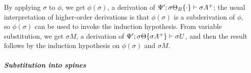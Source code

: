 \begin{itemize}
  By applying $\sigma$ to $\phi$, we get $\phi(\sigma)$, a derivation 
  of ${\Psi'};{{\sigma\Theta_B}\{{\cdot}\}} \vdash {\sigma{A^+}}$;
  the usual interpretation of higher-order derivations is that 
  $\phi(\sigma)$ is a subderivation of $\phi$, so $\phi(\sigma)$ can be
  used to invoke the induction hypothesis.
  From variable substitution, we get
  $\sigma{M}$, a derivation of 
  ${\Psi'};{{\sigma\Theta}\{{\sigma{A^+}}\}} \vdash {\sigma{U}}$, and then
  the result follows by the induction hypothesis on 
  $\phi(\sigma)$ and $\sigma{M}$. 

\end{itemize}

\paragraph{\it Substitution into spines}

